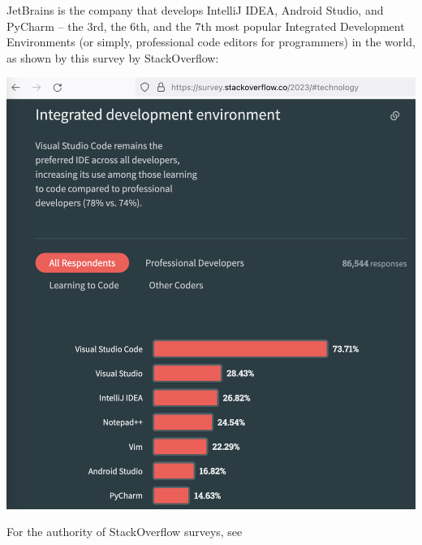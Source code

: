 JetBrains is the company that develops IntelliJ IDEA, Android Studio, and PyCharm --
the 3rd, the 6th, and the 7th most popular
Integrated Development Environments (or simply, professional code editors for programmers)
in the world, as shown by this survey by StackOverflow:

\includegraphics[width=\textwidth]{jetbrains-popularity}

For the authority of StackOverflow surveys, see 

\pagebreak
